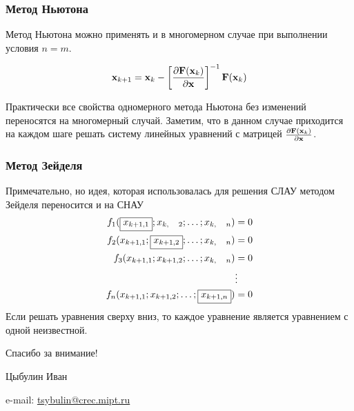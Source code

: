 \documentclass[apectratio=43,unicode]{beamer}
\newcommand{\colorhref}[2]{\href{#1}{\textcolor{miptbase!30!black}{#2}}}
\begin{document}
\begin{frame}
\frametitle{Метод Ньютона}
	Метод Ньютона можно применять и в многомерном случае при выполнении условия $n = m$.

	\[
	{\bf x}_{k+1} = {\bf x}_k - \left[\frac{\partial {\bf F}({\bf x}_k)}{\partial {\bf x}}\right]^{-1} {\bf F}({\bf x}_k)
	\]

	Практически все свойства одномерного метода Ньютона без изменений переносятся на многомерный случай. Заметим, что в данном случае приходится
	на каждом шаге решать систему линейных уравнений с матрицей $\frac{\partial {\bf F}({\bf x}_k)}{\partial {\bf x}}$.
\end{frame}

%
%
%
%

\begin{frame}
\frametitle{Метод Зейделя}
	Примечательно, но идея, которая использовалась для решения СЛАУ методом Зейделя переносится и на СНАУ
	\begin{align*}
	f_1(\fbox{$x_{k+1,1}$}; x_{k,\phantom{+1}2};\dots;x_{k,\phantom{+1}n}) &=0\\
	f_2(x_{k+1,1};\fbox{$x_{k+1,2}$}; \dots; x_{k,\phantom{+1}n}) &=0\\
	f_3(x_{k+1,1};x_{k+1,2};\dots; x_{k,\phantom{+1}n}) &=0\\
	&\vdots\\
	f_n(x_{k+1,1};x_{k+1,2};\dots;\fbox{$x_{k+1,n}$}) &= 0
	\end{align*}
	Если решать уравнения сверху вниз, то каждое уравнение является уравнением с одной неизвестной.
\end{frame}

\begin{frame}[plain]
  \begin{center}
  {\Huge Спасибо за внимание!}
  \vspace{8ex}

  Цыбулин Иван

  e-mail: \colorhref{mailto:tsybulin@crec.mipt.ru}{tsybulin@crec.mipt.ru}
  \end{center}
\end{frame}
\end{document}
